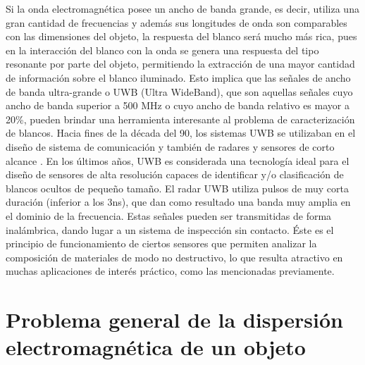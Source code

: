 Si la onda electromagnética posee un ancho de banda grande, es decir, utiliza una gran cantidad de frecuencias y además sus longitudes de onda son comparables con las dimensiones del objeto, la respuesta del blanco será mucho más rica, pues en la interacción del blanco con la onda se genera una respuesta del tipo resonante por parte del objeto, permitiendo la extracción de una mayor cantidad de información sobre el blanco iluminado. Esto implica que las señales de ancho de banda ultra-grande o UWB (Ultra WideBand), que son aquellas señales cuyo ancho de banda superior a 500 MHz o cuyo ancho de banda relativo es mayor a 20\%, pueden brindar una herramienta interesante al problema de caracterización de blancos. Hacia fines de la década del 90, los sistemas UWB se utilizaban en el diseño de sistema de comunicación y también de radares y sensores de corto alcance \cite{Cuomo1999, Taylor1995}. En los últimos años, UWB es considerada una tecnología ideal para el diseño de sensores de alta resolución capaces de identificar y/o clasificación de blancos ocultos de pequeño tamaño. El radar UWB utiliza pulsos de muy corta duración (inferior a los 3ns), que dan como resultado una banda muy amplia en el dominio de la frecuencia. Estas señales pueden ser transmitidas de forma inalámbrica, dando lugar a un sistema de inspección sin contacto. Éste es el principio de funcionamiento de ciertos sensores que permiten analizar la composición de materiales de modo no destructivo, lo que resulta atractivo en muchas aplicaciones de interés práctico, como las mencionadas previamente. 



\section{Problema general de la dispersión electromagnética de un objeto}

